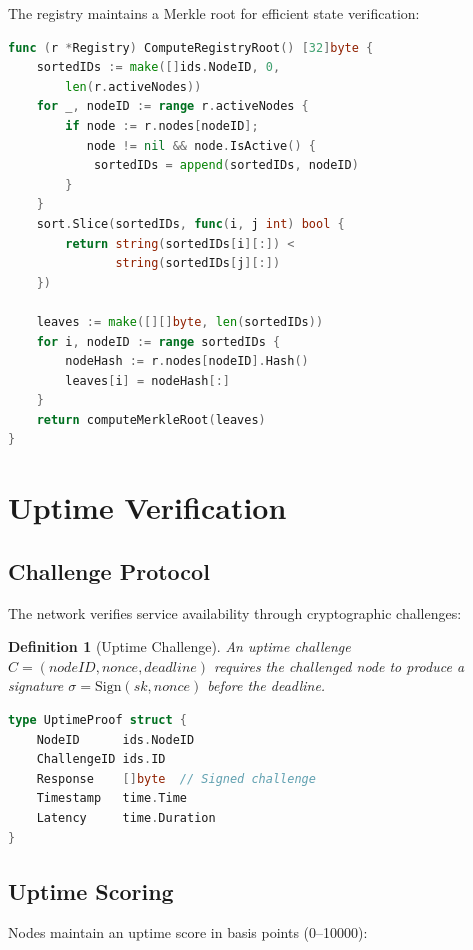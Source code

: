 \documentclass[11pt,a4paper]{article}
\newtheorem{definition}{Definition}
\begin{document}
The registry maintains a Merkle root for efficient state verification:

\begin{lstlisting}[language=Go,caption={Registry Root Computation}]
func (r *Registry) ComputeRegistryRoot() [32]byte {
    sortedIDs := make([]ids.NodeID, 0,
        len(r.activeNodes))
    for _, nodeID := range r.activeNodes {
        if node := r.nodes[nodeID];
           node != nil && node.IsActive() {
            sortedIDs = append(sortedIDs, nodeID)
        }
    }
    sort.Slice(sortedIDs, func(i, j int) bool {
        return string(sortedIDs[i][:]) <
               string(sortedIDs[j][:])
    })

    leaves := make([][]byte, len(sortedIDs))
    for i, nodeID := range sortedIDs {
        nodeHash := r.nodes[nodeID].Hash()
        leaves[i] = nodeHash[:]
    }
    return computeMerkleRoot(leaves)
}
\end{lstlisting}

\section{Uptime Verification}

\subsection{Challenge Protocol}

The network verifies service availability through cryptographic challenges:

\begin{definition}[Uptime Challenge]
An uptime challenge $C = (nodeID, nonce, deadline)$ requires the challenged node to produce a signature $\sigma = \text{Sign}(sk, nonce)$ before the deadline.
\end{definition}

\begin{lstlisting}[language=Go,caption={Uptime Proof}]
type UptimeProof struct {
    NodeID      ids.NodeID
    ChallengeID ids.ID
    Response    []byte  // Signed challenge
    Timestamp   time.Time
    Latency     time.Duration
}
\end{lstlisting}

\subsection{Uptime Scoring}

Nodes maintain an uptime score in basis points (0--10000):
\end{document}
